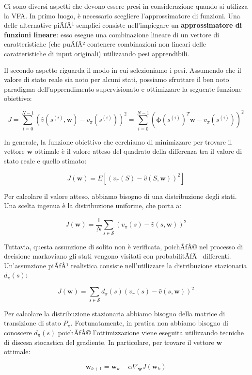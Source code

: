 ﻿\documentclass[11pt, a4paper]{report}
\begin{document}
Ci sono diversi aspetti che devono essere presi in considerazione quando si utilizza la VFA. In primo luogo, è necessario scegliere l'approssimatore di funzioni. Una delle alternative piÃƒÂ¹ semplici consiste nell'impiegare un \textbf{approssimatore di funzioni lineare}: esso esegue una combinazione lineare di un vettore di caratteristiche (che puÃƒÂ² contenere combinazioni non lineari delle caratteristiche di input originali) utilizzando pesi apprendibili.

Il secondo aspetto riguarda il modo in cui selezioniamo i pesi. Assumendo che il valore di stato reale sia noto per alcuni stati, possiamo sfruttare il ben noto paradigma dell'apprendimento supervisionato e ottimizzare la seguente funzione obiettivo:

\[
J = \sum_{i=0}^{N-1} (\hat{v}(s^{(i)}, \bm{w}) - v_\pi(s^{(i)}))^2 = \sum_{i=0}^{N-1} (\bm{\phi}(s^{(i)})^T \bm{w} - v_\pi(s^{(i)}))^2 \tag{6.2}
\]

\newpage

In generale, la funzione obiettivo che cerchiamo di minimizzare per trovare il vettore $\bm{w}$ ottimale è il valore atteso del quadrato della differenza tra il valore di stato reale e quello stimato:

\[
J(\bm{w}) = E[(v_\pi(S) - \hat{v}(S, \bm{w}))^2] \tag{6.3}
\]

Per calcolare il valore atteso, abbiamo bisogno di una distribuzione degli stati. Una scelta ingenua è la distribuzione uniforme, che porta a:

\[
J(\bm{w}) = \frac{1}{N} \sum_{s \in \mathcal{S}} (v_\pi(s) - \hat{v}(s, \bm{w}))^2 \tag{6.4}
\]

Tuttavia, questa assunzione di solito non è verificata, poichÃƒÂ© nel processo di decisione markoviano gli stati vengono visitati con probabilitÃƒÂ  differenti. Un'assunzione piÃƒÂ¹ realistica consiste nell'utilizzare la distribuzione stazionaria $d_\pi(s)$:

\[
J(\bm{w}) = \sum_{s \in \mathcal{S}} d_\pi(s)(v_\pi(s) - \hat{v}(s, \bm{w}))^2 \tag{6.5}
\]

Per calcolare la distribuzione stazionaria abbiamo bisogno della matrice di transizione di stato $P_\pi$. Fortunatamente, in pratica non abbiamo bisogno di conoscere $d_\pi(s)$ poichÃƒÂ© l'ottimizzazione viene eseguita utilizzando tecniche di discesa stocastica del gradiente. In particolare, per trovare il vettore $\bm{w}$ ottimale:

\[
\bm{w}_{k+1} = \bm{w}_k - \alpha \nabla_{\bm{w}} J(\bm{w}_k) \tag{6.6}
\]
\end{document}
